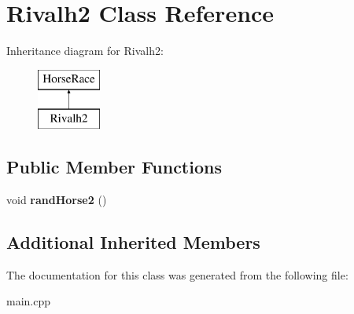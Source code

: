 \hypertarget{class_rivalh2}{\section{Rivalh2 Class Reference}
\label{class_rivalh2}
}
Inheritance diagram for Rivalh2\-:\begin{figure}[H]
\begin{center}
\leavevmode
\includegraphics[height=2.000000cm]{class_rivalh2}
\end{center}
\end{figure}
\subsection*{Public Member Functions}
\begin{DoxyCompactItemize}
\item 
\hypertarget{class_rivalh2_aa72fd70dfdb1daa87b23451751d535ce}{void {\bfseries rand\-Horse2} ()}\label{class_rivalh2_aa72fd70dfdb1daa87b23451751d535ce}

\end{DoxyCompactItemize}
\subsection*{Additional Inherited Members}


The documentation for this class was generated from the following file\-:\begin{DoxyCompactItemize}
\item 
main.\-cpp\end{DoxyCompactItemize}
